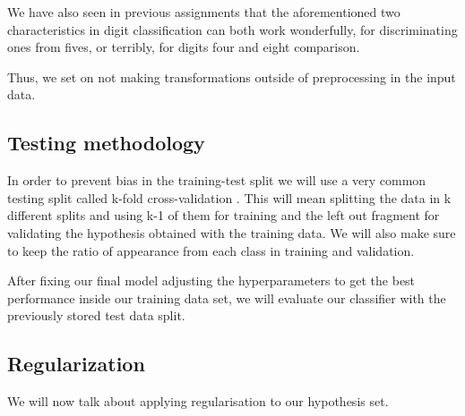 \documentclass{article}
\begin{document}
We have also seen in previous assignments that the aforementioned two characteristics in digit classification can both work wonderfully, for discriminating ones from fives, or terribly, for digits four and eight comparison.

Thus, we set on not making transformations outside of preprocessing in the input data.


\subsection{Testing methodology}
In order to prevent bias in the training-test split we will use a very common testing split called k-fold cross-validation \cite{edsjsr.298480919740101}. This will mean splitting the data in k different splits and using k-1 of them for training and the left out fragment for validating the hypothesis obtained with the training data. We will also make sure to keep the ratio of appearance from each class in training and validation.





After fixing our final model adjusting the hyperparameters to get the best performance inside our training data set, we will evaluate our classifier with the previously stored test data split.


\subsection{Regularization}
We will now talk about applying regularisation to our hypothesis set.
\end{document}
